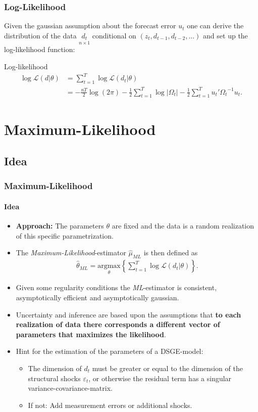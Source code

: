 \documentclass[handout]{beamer}  %
\begin{document}
\begin{frame}\frametitle{Log-Likelihood}
	Given the gaussian assumption about the forecast error ${u_t}$ one can derive the distribution of the data $\underset{n \times 1}{{d_t}}$ conditional on
	$({z_t},{d_{t-1}},{d_{t-2}},\dots)$ and set up the log-likelihood function:
	
	\begin{block}{Log-likelihood}
		\begin{align*}
			\log{ \mathcal{L}({d}|{\theta})} &= \sum_{t=1}^T \log{\mathcal{L}({d_t}|{\theta})}\\ &=-\frac{nT}{2} \log(2\pi) - \frac{1}{2}\sum_{t=1}^{T} \log{|{\Omega_t}|}- \frac{1}{2} \sum_{t=1}^T {u_t}' {\Omega_t}^{-1} {u_t}.
		\end{align*}
	\end{block}
\end{frame}

\section{Maximum-Likelihood}

\subsection{Idea}
\begin{frame}\frametitle{Maximum-Likelihood}\framesubtitle{Idea}
	\begin{itemize}
		\item \textbf{Approach:} The parameters ${\theta}$ are fixed and the data is a random realization of this specific parametrization.
		\item  The \emph{Maximum-Likelihood}-estimator ${\widehat{\mu}_{ML}}$ is then defined as
		\begin{align*}
			{\widehat{\theta}_{ML}} = \underset{\theta}{\text{argmax}}\left\{ \sum_{t=1}^T \log{\mathcal{L}({d_t}|{\theta})} \right\}.
		\end{align*}
		\item Given some regularity conditions the \emph{ML}-estimator is consistent, asymptotically efficient and asymptotically gaussian.
		\item Uncertainty and inference are based upon the assumptions that \textbf{to each realization of data there corresponds a different vector of parameters that maximizes the likelihood}.
		\item Hint for the estimation of the parameters of a DSGE-model:
		\begin{itemize} \item The dimension of ${d_t}$ must be greater or equal to the dimension of the structural shocks ${\varepsilon_t}$, or otherwise the residual term has a singular variance-covariance-matrix.
			\item If not: Add measurement errors or additional shocks.
		\end{itemize}
	\end{itemize}
\end{frame}
\end{document}
